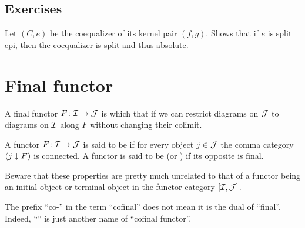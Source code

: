 \subsection{Exercises}
\begin{exam}
  Let $(C,e)$ be the coequalizer of its kernel pair $(f,g)$. Shows that if $e$ is split epi, then the coequalizer is split and thus absolute.
\end{exam}


\newpage\section{Final functor}
A final functor $F \colon{\cal I}\to{\cal J}$ is which that if we can restrict diagrams on ${\cal J}$ to diagrams on ${\cal I}$ along $F$ without changing their colimit.

\begin{defn}
  A functor $F\colon{\cal I}\to{\cal J}$ is said to be  if for every object $j \in {\cal J}$ the comma category $(j\downarrow F)$ is connected.
  A functor is said to be  (or ) if its opposite is final.
\end{defn}
\begin{rem}
  Beware that these properties are pretty much unrelated to that of a functor being an initial object or terminal object in the functor category $[{\cal I},{\cal J}]$.
\end{rem}
\begin{rem}
  The prefix ``co-'' in the term ``cofinal'' does not mean it is the dual of ``final''. Indeed, ``'' is just another name of ``cofinal functor''.
\end{rem}

